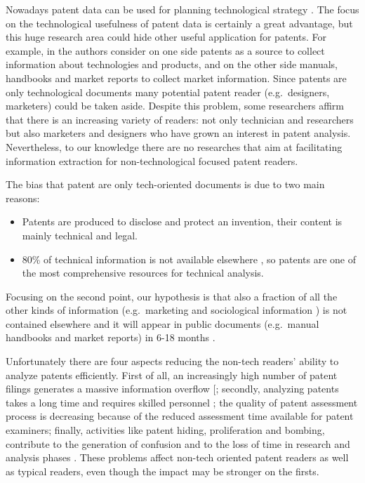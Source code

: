 \documentclass[]{book}
\providecommand{\tightlist}{%
  \setlength{\itemsep}{0pt}\setlength{\parskip}{0pt}}
\begin{document}
Nowadays patent data can be used for planning technological strategy
\citep{ernst2003patent}. The focus on the technological usefulness of
patent data is certainly a great advantage, but this huge research area
could hide other useful application for patents. For example, in
\citep{jin2015technology} the authors consider on one side patents as a
source to collect information about technologies and products, and on
the other side manuals, handbooks and market reports to collect market
information. Since patents are only technological documents many
potential patent reader (e.g.~designers, marketers) could be taken
aside. Despite this problem, some researchers \citep{bonino2010review}
affirm that there is an increasing variety of readers: not only
technician and researchers but also marketers and designers who have
grown an interest in patent analysis. Nevertheless, to our knowledge
there are no researches that aim at facilitating information extraction
for non-technological focused patent readers.

The bias that patent are only tech-oriented documents is due to two main
reasons:

\begin{itemize}
\tightlist
\item
  Patents are produced to disclose and protect an invention, their
  content is mainly technical and legal.
\item
  80\% of technical information is not available elsewhere
  \citep{terragno1979}, so patents are one of the most comprehensive
  resources for technical analysis.
\end{itemize}

Focusing on the second point, our hypothesis is that also a fraction of
all the other kinds of information (e.g.~marketing and sociological
information ) is not contained elsewhere and it will appear in public
documents (e.g.~manual handbooks and market reports) in 6-18 months
\citep{golzio2012}.

Unfortunately there are four aspects reducing the non-tech readers'
ability to analyze patents efficiently. First of all, an increasingly
high number of patent filings generates a massive information overflow
{[}\citet{bergmann2008evaluating}; secondly, analyzing patents takes a
long time and requires skilled personnel \citep{liang2007text}; the
quality of patent assessment process is decreasing
\citep{burke2007, philipp2006} because of the reduced assessment time
available for patent examiners; finally, activities like patent hiding,
proliferation and bombing, contribute to the generation of confusion and
to the loss of time in research and analysis phases
\citep{fantoni2013automatic}. These problems affect non-tech oriented
patent readers as well as typical readers, even though the impact may be
stronger on the firsts.
\end{document}
